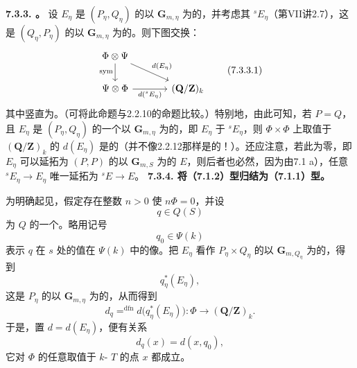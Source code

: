 \textbf{7.3.3. 。} 设 $E_\eta$ 是 $(P_\eta,Q_\eta)$ 的以 $\mathbf G_{m,\eta}$ 为的，并考虑其 ${}^{s}E_\eta$（第VII讲2.7），这是 $(Q_\eta,P_\eta)$ 的以 $\mathbf G_{m,\eta}$ 为的。则下图交换：
\[
\begin{tikzcd}[column sep=large]
\Phi\otimes\Psi\arrow[d,"\mathrm{sym}"']\arrow[dr,"d(E_\eta)"]&\\
\Psi\otimes\Phi\arrow[r,"d({}^{s}E_\eta)"']&(\mathbf Q/\mathbf Z)_k
\end{tikzcd}\tag{7.3.3.1}
\]
其中竖直为。（可将此命题与2.2.10的命题比较。）特别地，由此可知，若 $P=Q$，且 $E_\eta$ 是 $(P_\eta,Q_\eta)$ 的一个以 $\mathbf G_{m,\eta}$ 为的，即 $E_\eta$ 于 ${}^{s}E_\eta$，则 $\Phi\times\Phi$ 上取值于 $(\mathbf Q/\mathbf Z)_k$ 的 $d(E_\eta)$ 是的（并不像2.2.12那样是的！）。还应注意，若此为零，即 $E_\eta$ 可以延拓为 $(P,P)$ 的以 $\mathbf G_{m,S}$ 为的 $E$，则后者也必然，因为由7.1 a），任意 ${}^{s}E_\eta\to E_\eta$ 唯一延拓为 ${}^{s}E\to E$。
\textbf{7.3.4. 将（7.1.2）型归结为（7.1.1）型。}

为明确起见，假定存在整数 $n>0$ 使 $n\Phi=0$，并设
\[
q\in Q(S)
\]
为 $Q$ 的一个。略用记号
\[
q_0\in\Psi(k)
\]
表示 $q$ 在 $s$ 处的值在 $\Psi(k)$ 中的像。把 $E_\eta$ 看作 $P_\eta\times Q_\eta$ 的以 $\mathbf G_{m,Q_\eta}$ 为的，得到
\[
q_\eta^*(E_\eta),
\]
这是 $P_\eta$ 的以 $\mathbf G_{m,\eta}$ 为的，从而得到
\[
d_q\mathrel{\mathop=^{\mathrm{dfn}}}d\bigl(q_\eta^*(E_\eta)\bigr):\Phi\longrightarrow(\mathbf Q/\mathbf Z)_k.\tag{7.3.4.1}
\]
于是，置 $d=d(E_\eta)$，便有关系
\[
d_q(x)=d(x,q_0),\tag{7.3.4.2}
\]
它对 $\Phi$ 的任意取值于 $k$- $T$ 的点 $x$ 都成立。

